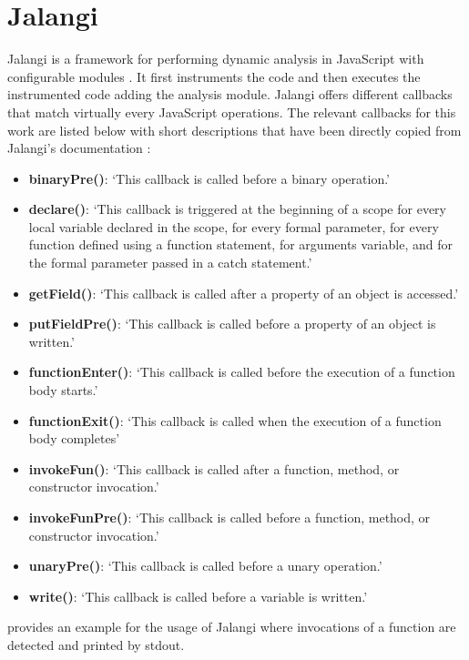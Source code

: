 \section{Jalangi} \label{sec:jalangi}
Jalangi is a framework for performing dynamic analysis in JavaScript with configurable modules \citep{DBLP:conf/sigsoft/SenKBG13}. It first instruments the code and then executes the instrumented code adding the analysis module. Jalangi offers different callbacks that match virtually every JavaScript operations. The relevant callbacks for this work are listed below with short descriptions that have been directly copied from Jalangi's documentation \citep{jalangi-docs}:
\begin{itemize}
	\item \textbf{binaryPre()}: `This callback is called before a binary operation.'
	\item \textbf{declare()}: `This callback is triggered at the beginning of a scope for every local variable declared in the scope, for every formal parameter, for every function defined using a function statement, for arguments variable, and for the formal parameter passed in a catch statement.'
	\item \textbf{getField()}: `This callback is called after a property of an object is accessed.'
	\item \textbf{putFieldPre()}: `This callback is called before a property of an object is written.'
	\item \textbf{functionEnter()}: `This callback is called before the execution of a function body starts.'
	\item \textbf{functionExit()}: `This callback is called when the execution of a function body completes'
	\item \textbf{invokeFun()}: `This callback is called after a function, method, or constructor invocation.'
	\item \textbf{invokeFunPre()}: `This callback is called before a function, method, or constructor invocation.'
	\item \textbf{unaryPre()}: `This callback is called before a unary operation.'
	\item \textbf{write()}: `This callback is called before a variable is written.'
  \end{itemize}

 provides an example for the usage of Jalangi where invocations of a function are detected and printed by stdout.

